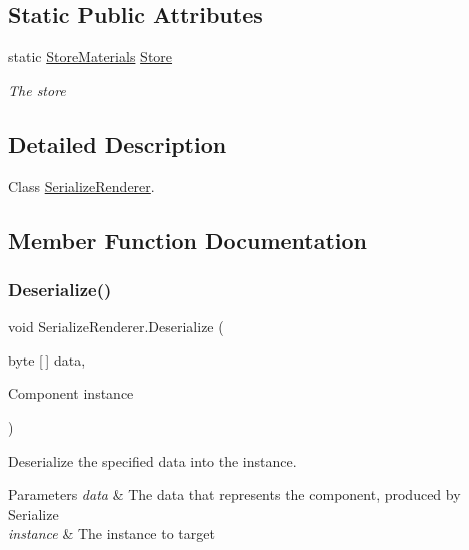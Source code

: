 \subsection*{Static Public Attributes}
\begin{DoxyCompactItemize}
\item 
static \hyperlink{class_serialization_1_1_store_materials}{Store\+Materials} \hyperlink{class_serialize_renderer_a764f2c274eae672b01d2c22554053dc1}{Store}
\begin{DoxyCompactList}\small\item\em The store \end{DoxyCompactList}\end{DoxyCompactItemize}


\subsection{Detailed Description}
Class \hyperlink{class_serialize_renderer}{Serialize\+Renderer}. 



\subsection{Member Function Documentation}
\mbox{\label{class_serialize_renderer_a98dc10a848db6d55165ce92ce5521c39}} 
\subsubsection{\texorpdfstring{Deserialize()}{Deserialize()}}
{\footnotesize\ttfamily void Serialize\+Renderer.\+Deserialize (\begin{DoxyParamCaption}\item[{byte \mbox{[}$\,$\mbox{]}}]{data,  }\item[{Component}]{instance }\end{DoxyParamCaption})\hspace{0.3cm}{\ttfamily [inline]}}



Deserialize the specified data into the instance. 


\begin{DoxyParams}{Parameters}
{\em data} & The data that represents the component, produced by Serialize\\
\hline
{\em instance} & The instance to target\\
\hline
\end{DoxyParams}



